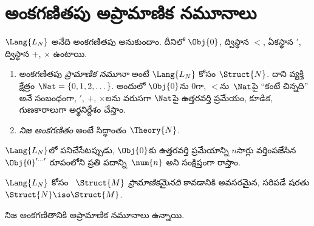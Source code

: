 \documentclass[../../../include/open-logic-section]{subfiles}
\begin{document}
\section{అంకగణితపు అప్రామాణిక నమూనాలు}

\begin{defn}
$\Lang{L_N}$ అనేది అంకగణితపు  అనుకుందాం. దీనిలో  $\Obj{0}$, ద్విస్థాన  $<$, ఏకస్థాన  $\prime$, ద్విస్థాన  $+$, $\times$ ఉంటాయి.
\begin{enumerate}
\item అంకగణితపు \emph{ప్రామాణిక నమూనా} అంటే $\Lang{L_N}$ కోసం  $\Struct{N}$. దాని వ్యక్తి క్షేత్రం $\Nat = \{ 0, 1, 2, \dots\}$. అందులో $\Obj{0}$ను $0$గా, $<$ను~$\Nat$పై ``కంటే చిన్నది'' అనే సంబంధంగా, $\prime$, $+$, $\times$లను వరుసగా $\Nat$పై ఉత్తరవర్తి ప్రమేయం, కూడిక, గుణకారాలుగా అర్థనిర్దేశం చేస్తాం.
\item \emph{నిజ అంకగణితం} అంటే సిద్ధాంతం $\Theory{N}$.
\end{enumerate}
\end{defn}

$\Lang{L_N}$లో పనిచేసేటప్పుడు, $\Obj{0}$కు ఉత్తరవర్తి ప్రమేయాన్ని $n$సార్లు వర్తింపజేసిన $\Obj{0}^{\prime\dots\prime}$ రూపంలోని ప్రతి పదాన్ని~$\num{n}$ అని సంక్షిప్తంగా రాస్తాం.

\begin{defn}
$\Lang{L_N}$ కోసం ~$\Struct{M}$ \emph{ప్రామాణికమైనది} కావడానికి అవసరమైన, సరిపడే షరతు $\Struct{N} \iso \Struct{M}$.
\end{defn}

\begin{thm}
నిజ అంకగణితానికి  అప్రామాణిక నమూనాలు ఉన్నాయి.
\end{thm}
\end{document}
